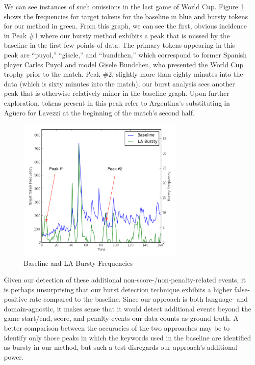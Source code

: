 \documentclass{acm_proc_article-sp}
\begin{document}
We can see instances of such omissions in the last game of World Cup.
Figure \ref{fig:worldCupFreqs} shows the frequencies for target tokens for the baseline in blue and bursty tokens for our method in green.
From this graph, we can see the first, obvious incidence in Peak \#1 where our bursty method exhibits a peak that is missed by the baseline in the first few points of data.
The primary tokens appearing in this peak are ``puyol,'' ``gisele,'' and ``bundchen,'' which correspond to former Spanish player Carles Puyol and model Gisele Bundchen, who presented the World Cup trophy prior to the match.
Peak \#2, slightly more than eighty minutes into the data (which is sixty minutes into the match), our burst analysis sees another peak that is otherwise relatively minor in the baseline graph.
Upon further exploration, tokens present in this peak refer to Argentina's substituting in Ag\"{u}ero for Lavezzi at the beginning of the match's second half.

\begin{figure}[hbtp]
\begin{center}
\includegraphics[width=3.25in]{./figures/wc0713freq-labeled.png}
\caption{Baseline and LA Bursty Frequencies}
\label{fig:worldCupFreqs}
\end{center}
\end{figure}

Given our detection of these additional non-score-/non-penalty-related events, it is perhaps unsurprising that our burst detection technique exhibits a higher false-positive rate compared to the baseline.
Since our approach is both language- and domain-agnostic, it makes sense that it would detect additional events beyond the game start/end, score, and penalty events our data counts as ground truth.
A better comparison between the accuracies of the two approaches may be to identify only those peaks in which the keywords used in the baseline are identified as bursty in our method, but such a test disregards our approach's additional power.
\end{document}
